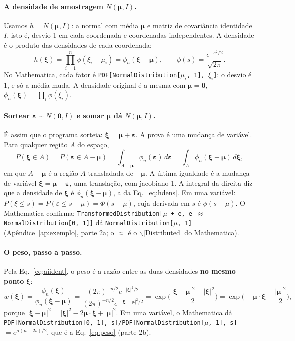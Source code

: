 \documentclass[11pt,a4paper]{article}
\newcommand{\xib}{\bm\xi}
\begin{document}
\paragraph{A densidade de amostragem $N(\bm\mu, I)$.} Usamos $h = N(\bm\mu, I)$: a normal com média $\bm\mu$ e matriz
de covariância identidade $I$, isto é, desvio 1 em cada coordenada e coordenadas independentes. A densidade é o produto
das densidades de cada coordenada:
\begin{equation}
  h(\xib) = \prod_{i=1}^n \phi(\xi_i - \mu_i) = \phi_n(\xib - \bm\mu), \qquad \phi(s) = \frac{e^{-s^2/2}}{\sqrt{2\pi}}.
  \label{eq:hdens}
\end{equation}
No Mathematica, cada fator é \texttt{PDF[NormalDistribution[$\mu_i$, 1], $\xi_i$]}: o desvio é 1, e só a média muda. A
densidade original é a mesma com $\bm\mu = \bm 0$, $\phi_n(\xib) = \prod_i \phi(\xi_i)$.

\paragraph{Sortear $\bm\varepsilon \sim N(\bm 0, I)$ e somar $\bm\mu$ dá $N(\bm\mu, I)$.} É assim que o programa sorteia:
$\xib = \bm\mu + \bm\varepsilon$. A prova é uma mudança de variável. Para qualquer região $A$ do espaço,
\begin{equation}
  P(\xib \in A) = P(\bm\varepsilon \in A - \bm\mu) = \int_{A - \bm\mu}\phi_n(\bm\varepsilon)\,d\bm\varepsilon
  = \int_A \phi_n(\xib - \bm\mu)\,d\xib,
  \label{eq:translacao}
\end{equation}
em que $A - \bm\mu$ é a região $A$ transladada de $-\bm\mu$. A última igualdade é a mudança de variável
$\xib = \bm\mu + \bm\varepsilon$, uma translação, com jacobiano 1. A integral da direita diz que a densidade de $\xib$ é
$\phi_n(\xib - \bm\mu)$, a da Eq.~\eqref{eq:hdens}. Em uma variável: $P(\xi \le s) = P(\varepsilon \le s - \mu) =
\Phi(s - \mu)$, cuja derivada em $s$ é $\phi(s - \mu)$. O Mathematica confirma:
\texttt{TransformedDistribution[$\mu$ + e, e $\approx$ NormalDistribution[0, 1]]} dá \texttt{NormalDistribution[$\mu$,
1]} (Apêndice~\ref{ap:exemplo}, parte 2a; o $\approx$ é o $\backslash$[Distributed] do Mathematica).

\paragraph{O peso, passo a passo.} Pela Eq.~\eqref{eq:aiident}, o peso é a razão entre as duas densidades \textbf{no
mesmo ponto} $\xib$:
\begin{equation}
  w(\xib) = \frac{\phi_n(\xib)}{\phi_n(\xib - \bm\mu)}
  = \frac{(2\pi)^{-n/2}e^{-|\xib|^2/2}}{(2\pi)^{-n/2}e^{-|\xib - \bm\mu|^2/2}}
  = \exp\Big(\frac{|\xib - \bm\mu|^2 - |\xib|^2}{2}\Big)
  = \exp\Big(-\bm\mu\cdot\xib + \frac{|\bm\mu|^2}{2}\Big),
  \label{eq:peso}
\end{equation}
porque $|\xib - \bm\mu|^2 = |\xib|^2 - 2\bm\mu\cdot\xib + |\bm\mu|^2$. Em uma variável, o Mathematica dá
\texttt{PDF[NormalDistribution[0, 1], s]/PDF[NormalDistribution[$\mu$, 1], s]} $= e^{\mu(\mu - 2s)/2}$, que é a
Eq.~\eqref{eq:peso} (parte 2b).
\end{document}
